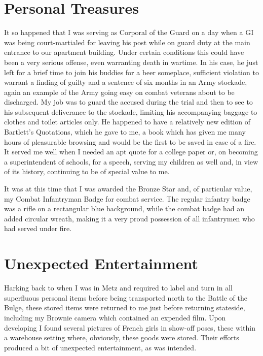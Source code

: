 \documentclass[../m3y]{subfiles}
\begin{document}
\section{Personal Treasures}
It so happened that I was serving as Corporal of the Guard on a day when a GI was being court-martialed for leaving his post while on guard duty at the main entrance to our apartment building. Under certain conditions this could have been a very serious offense, even warranting death in wartime. In his case, he just left for a brief time to join his buddies for a beer someplace, sufficient violation to warrant a finding of guilty and a sentence of six months in an Army stockade, again an example of the Army going easy on combat veterans about to be discharged. My job was to guard the accused during the trial and then to see to his subsequent deliverance to the stockade, limiting his accompanying baggage to clothes and toilet articles only. He happened to have a relatively new edition of Bartlett's Quotations, which he gave to me, a book which has given me many hours of pleasurable browsing and would be the first to be saved in case of a fire. It served me well when I needed an apt quote for a college paper or, on becoming a superintendent of schools, for a speech, serving my children as well and, in view of its history, continuing to be of special value to me.

It was at this time that I was awarded the Bronze Star and, of particular value, my Combat Infantryman Badge for combat service. The regular infantry badge was a rifle on a rectangular blue background, while the combat badge had an added circular wreath, making it a very proud possession of all infantrymen who had served under fire.

\section{Unexpected Entertainment}
Harking back to when I was in Metz and required to label and turn in all superfluous personal items before being transported north to the Battle of the Bulge, these stored items were returned to me just before returning stateside, including my Brownie camera which contained an expended film. Upon developing I found several pictures of French girls in show-off poses, these within a warehouse setting where, obviously, these goods were stored. Their efforts produced a bit of unexpected entertainment, as was intended.
\end{document}
